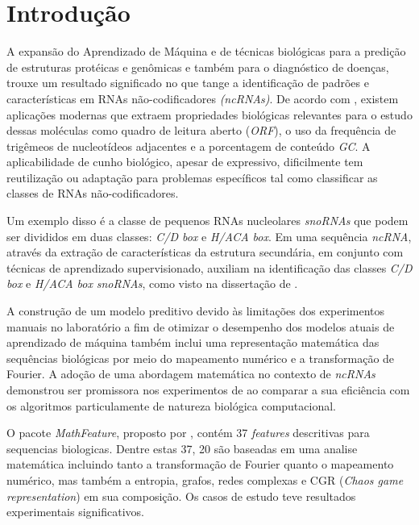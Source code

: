 \chapter{Introdução}
\label{chp:introduction}

A expansão do Aprendizado de Máquina e de técnicas biológicas para a predição de estruturas protéicas e genômicas e também para o diagnóstico de doenças, trouxe um resultado significado no que tange a identificação de padrões e características em RNAs não-codificadores \textit{(ncRNAs)}. De acordo com \cite{math-feature-bio}, existem aplicações modernas que extraem propriedades biológicas relevantes para o estudo dessas moléculas como quadro de leitura aberto (\textit{ORF}), o uso da frequência de trigêmeos de nucleotídeos adjacentes e a porcentagem de conteúdo \textit{GC}. A aplicabilidade de cunho biológico, apesar de expressivo, dificilmente tem reutilização ou adaptação para problemas específicos tal como classificar as classes de RNAs não-codificadores.

Um exemplo disso é a classe de pequenos RNAs nucleolares \textit{snoRNAs} que podem ser divididos em duas classes: \textit{C/D box} e \textit{H/ACA box}. Em uma sequência \textit{ncRNA}, através da extração de características da estrutura secundária, em conjunto com técnicas de aprendizado supervisionado, auxiliam na identificação das classes \textit{C/D box} e \textit{H/ACA box} \textit{snoRNAs}, como visto na dissertação de \cite{snoRNAs-article}.

A construção de um modelo preditivo devido às limitações dos experimentos manuais no laboratório a fim de otimizar o desempenho dos modelos atuais de aprendizado de máquina também inclui uma representação matemática das sequências biológicas por meio do mapeamento numérico e a transformação de Fourier. A adoção de uma abordagem matemática no contexto de \textit{ncRNAs} demonstrou ser promissora nos experimentos de \cite{math-feature-bio} ao comparar a sua eficiência com os algoritmos particulamente de natureza biológica computacional. 

O pacote \textit{MathFeature}, proposto por \cite{math-features-package}, contém 37 \textit{features} descritivas para sequencias biologicas. Dentre estas 37, 20 são baseadas em uma analise matemática incluindo tanto a transformação de Fourier quanto o mapeamento numérico, mas também a entropia, grafos, redes complexas e CGR (\textit{Chaos game representation}) em sua composição. Os casos de estudo teve resultados experimentais significativos.

